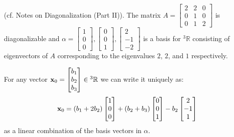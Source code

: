 \documentclass[10pt]{article}
\begin{document}
\begin{example}
    (cf. Notes on Diagonalization (Part II)). The matrix $A = \begin{bmatrix}
        2&2&0\\0&1&0 \\0&1&2
    \end{bmatrix}$ is diagonalizable and $\alpha= \begin{bmatrix}
        1\\0\\0
    \end{bmatrix}, \begin{bmatrix}
        0\\0\\1
    \end{bmatrix}, \begin{bmatrix}
        2 \\ -1 \\ -2
    \end{bmatrix}$ is a basis for ${^3}\mathbb{R}$ consisting of eigenvectors of $A$ corresponding to the eigenvalues $2$, $2$, and $1$ respectively.
    \vspace{2mm}

    For any vector $\mathbf{x}_0 = \begin{bmatrix}
        b_1\\b_2\\b_3
    \end{bmatrix} \in {^3}\mathbb{R}$ we can write it uniquely as:
    \begin{equation*}
        \mathbf{x}_0 = (b_1+2b_2)\begin{bmatrix}
            1\\0\\0
        \end{bmatrix} + (b_2+b_3)\begin{bmatrix}
            0\\0\\1
        \end{bmatrix} - b_2 \begin{bmatrix}
            2\\-1\\1
        \end{bmatrix}
    \end{equation*}
    as a linear combination of the basis vectors in $\alpha$.
    \vspace{2mm}


\end{example}
\end{document}
